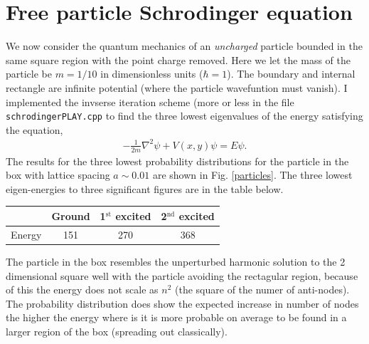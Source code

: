 \documentclass[singlepage,notitlepage,nofootinbib,11pt]{revtex4-1}
\begin{document}
\section{Free particle Schrodinger equation}
We now consider the quantum mechanics of an {\it uncharged} particle bounded in the same square region with the point charge removed. Here we let the mass of the particle be $m=1/10$ in dimensionless units ($\hbar = 1$). The boundary and internal rectangle are infinite potential (where the particle wavefuntion must vanish). I implemented the invserse iteration scheme (more or less in the file \texttt{schrodingerPLAY.cpp} to find the three lowest eigenvalues of the energy satisfying the equation,
\begin{align*}
  -\frac{1}{2m} \nabla^2\psi + V(x,y)\psi = E\psi.
\end{align*}
The results for the three lowest probability distributions for the particle in the box with lattice spacing $a\sim0.01$ are shown in Fig. \ref{particles}. The three lowest eigen-energies to three significant figures are in the table below.
\begin{center}
  \begin{tabular}{ c | c | c | c }
    \hspace{1pt} & Ground & 1$^{\text{st}}$ excited & 2$^{\text{nd}}$ excited \\ \hline
    Energy & 151 & 270 & 368
    \end{tabular}
\end{center}
The particle in the box resembles the unperturbed harmonic solution to the 2 dimensional square well with the particle avoiding the rectagular region, because of this the energy does not scale as $n^2$ (the square of the numer of anti-nodes). The probability distribution does show the expected increase in number of nodes the higher the energy where is it is more probable on average to be found in a larger region of the box (spreading out classically).
\end{document}
